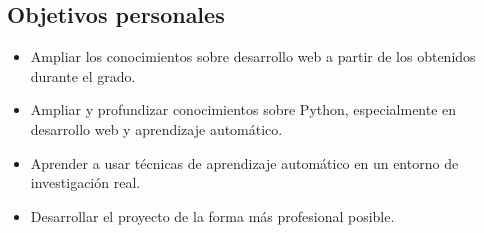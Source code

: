 \subsection{Objetivos personales}
\begin{itemize}
	\tightlist
	\item Ampliar los conocimientos sobre desarrollo web a partir de los obtenidos durante el grado.
	\item Ampliar y profundizar conocimientos sobre Python, especialmente en desarrollo web y aprendizaje automático.
	\item Aprender a usar técnicas de aprendizaje automático en un entorno de investigación real.
	\item Desarrollar el proyecto de la forma más profesional posible.
\end{itemize}